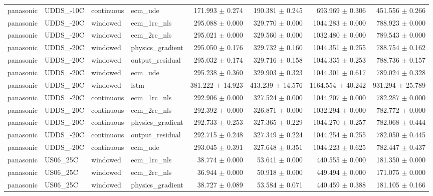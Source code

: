 \begin{longtable}{llllrrrr}
panasonic & UDDS\_-10C & continuous & ecm\_ude & 171.993 $\pm$ 0.274 & 190.381 $\pm$ 0.245 & 693.969 $\pm$ 0.306 & 451.556 $\pm$ 0.266 \\
panasonic & UDDS\_-20C & windowed & ecm\_1rc\_nls & 295.088 $\pm$ 0.000 & 329.770 $\pm$ 0.000 & 1044.283 $\pm$ 0.000 & 788.923 $\pm$ 0.000 \\
panasonic & UDDS\_-20C & windowed & ecm\_2rc\_nls & 295.021 $\pm$ 0.000 & 329.560 $\pm$ 0.000 & 1032.480 $\pm$ 0.000 & 789.543 $\pm$ 0.000 \\
panasonic & UDDS\_-20C & windowed & physics\_gradient & 295.050 $\pm$ 0.176 & 329.732 $\pm$ 0.160 & 1044.351 $\pm$ 0.255 & 788.754 $\pm$ 0.162 \\
panasonic & UDDS\_-20C & windowed & output\_residual & 295.032 $\pm$ 0.174 & 329.716 $\pm$ 0.158 & 1044.335 $\pm$ 0.253 & 788.736 $\pm$ 0.157 \\
panasonic & UDDS\_-20C & windowed & ecm\_ude & 295.238 $\pm$ 0.360 & 329.903 $\pm$ 0.323 & 1044.301 $\pm$ 0.617 & 789.024 $\pm$ 0.328 \\
panasonic & UDDS\_-20C & windowed & lstm & 381.222 $\pm$ 14.923 & 413.239 $\pm$ 14.576 & 1164.554 $\pm$ 40.242 & 931.294 $\pm$ 25.789 \\
panasonic & UDDS\_-20C & continuous & ecm\_1rc\_nls & 292.906 $\pm$ 0.000 & 327.524 $\pm$ 0.000 & 1044.207 $\pm$ 0.000 & 782.287 $\pm$ 0.000 \\
panasonic & UDDS\_-20C & continuous & ecm\_2rc\_nls & 292.392 $\pm$ 0.000 & 326.871 $\pm$ 0.000 & 1032.294 $\pm$ 0.000 & 782.772 $\pm$ 0.000 \\
panasonic & UDDS\_-20C & continuous & physics\_gradient & 292.733 $\pm$ 0.253 & 327.365 $\pm$ 0.229 & 1044.270 $\pm$ 0.257 & 782.068 $\pm$ 0.444 \\
panasonic & UDDS\_-20C & continuous & output\_residual & 292.715 $\pm$ 0.248 & 327.349 $\pm$ 0.224 & 1044.254 $\pm$ 0.255 & 782.050 $\pm$ 0.445 \\
panasonic & UDDS\_-20C & continuous & ecm\_ude & 293.045 $\pm$ 0.391 & 327.648 $\pm$ 0.351 & 1044.223 $\pm$ 0.625 & 782.447 $\pm$ 0.437 \\
panasonic & US06\_25C & windowed & ecm\_1rc\_nls & 38.774 $\pm$ 0.000 & 53.641 $\pm$ 0.000 & 440.555 $\pm$ 0.000 & 181.350 $\pm$ 0.000 \\
panasonic & US06\_25C & windowed & ecm\_2rc\_nls & 36.944 $\pm$ 0.000 & 50.918 $\pm$ 0.000 & 449.494 $\pm$ 0.000 & 171.075 $\pm$ 0.000 \\
panasonic & US06\_25C & windowed & physics\_gradient & 38.727 $\pm$ 0.089 & 53.584 $\pm$ 0.071 & 440.459 $\pm$ 0.388 & 181.105 $\pm$ 0.166 \\

\end{longtable}
